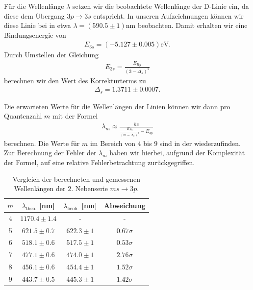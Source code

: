 Für die Wellenlänge $\lambda$ setzen wir die beobachtete Wellenlänge der D-Linie ein, da diese dem Übergang $3p \to 3s$ entspricht. In unseren Aufzeichnungen können wir diese Linie bei in etwa $\lambda = (590.5 \pm 1) \si{\nano\meter}$ beobachten. Damit erhalten wir eine Bindungsenergie von
\begin{align}
  E_{3s} = (-5.127 \pm 0.005) \si{\electronvolt}.
\end{align}
Durch Umstellen der Gleichung
\begin{align}
  E_{3s} = \frac{E_{Ry}}{(3 - \Delta_s)^2}
\end{align}
berechnen wir den Wert des Korrekturterms zu
\begin{align}
  \Delta_s = 1.3711 \pm 0.0007.
\end{align}

Die erwarteten Werte für die Wellenlängen der Linien können wir dann pro Quantenzahl $m$ mit der Formel
\begin{align}
  \lambda_m \approx \frac{hc}{\frac{E_{Ry}}{(m - \Delta_s)^2} - E_{3p}}
\end{align}
berechnen. Die Werte für $m$ im Bereich von $4$ bis $9$ sind in der  wiederzufinden. Zur Berechnung der Fehler der $\lambda_m$ haben wir hierbei, aufgrund der Komplexität der Formel, auf eine relative Fehlerbetrachtung zurückgegriffen.

\begin{table}[H]
  \centering
  \caption{Vergleich der berechneten und gemessenen Wellenlängen der 2. Nebenserie $ms \to 3p$.}
  \vspace*{0.5em}
  \begin{tabular}{c c c c}
      \hline
      $m$ & $\lambda_{\text{theo.}}$ [nm] & $\lambda_{\text{beob.}}$ [nm] & Abweichung \\
      \hline
      4  & $1170.4 \pm 1.4$ & -     & -     \\
      5  & $621.5 \pm 0.7$  & $622.3 \pm 1$ & $0.67\sigma$ \\
      6  & $518.1 \pm 0.6$  & $517.5 \pm 1$ & $0.53\sigma$ \\
      7  & $477.1 \pm 0.6$  & $474.0 \pm 1$ & $2.76\sigma$ \\
      8  & $456.1 \pm 0.6$  & $454.4 \pm 1$ & $1.52\sigma$ \\
      9  & $443.7 \pm 0.5$  & $445.3 \pm 1$ & $1.42\sigma$ \\
      \hline
  \end{tabular}
  \label{tab:wellenlaengen_2ns}
\end{table}

